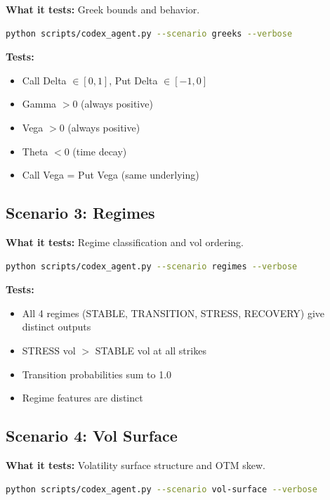 \documentclass[12pt,oneside,openany]{book}
\begin{document}
\textbf{What it tests:} Greek bounds and behavior.

\begin{lstlisting}[language=bash]
python scripts/codex_agent.py --scenario greeks --verbose
\end{lstlisting}

\textbf{Tests:}
\begin{itemize}
    \item Call Delta $\in [0, 1]$, Put Delta $\in [-1, 0]$
    \item Gamma $> 0$ (always positive)
    \item Vega $> 0$ (always positive)
    \item Theta $< 0$ (time decay)
    \item Call Vega = Put Vega (same underlying)
\end{itemize}

\subsection{Scenario 3: Regimes}

\textbf{What it tests:} Regime classification and vol ordering.

\begin{lstlisting}[language=bash]
python scripts/codex_agent.py --scenario regimes --verbose
\end{lstlisting}

\textbf{Tests:}
\begin{itemize}
    \item All 4 regimes (STABLE, TRANSITION, STRESS, RECOVERY) give distinct outputs
    \item STRESS vol $>$ STABLE vol at all strikes
    \item Transition probabilities sum to 1.0
    \item Regime features are distinct
\end{itemize}

\subsection{Scenario 4: Vol Surface}

\textbf{What it tests:} Volatility surface structure and OTM skew.

\begin{lstlisting}[language=bash]
python scripts/codex_agent.py --scenario vol-surface --verbose
\end{lstlisting}
\end{document}
